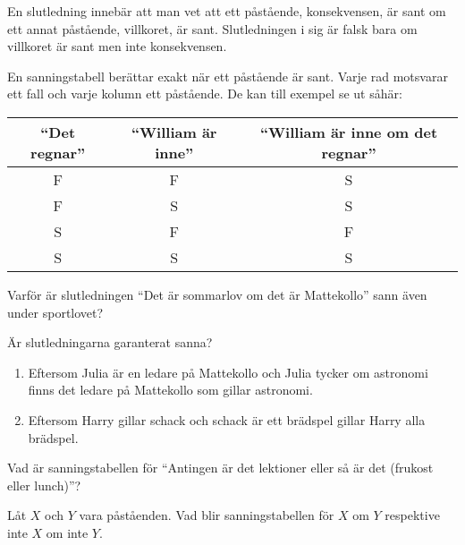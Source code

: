 \begin{definition}[Slutledning]
	En slutledning innebär att man vet att ett påstående, konsekvensen, är sant om ett annat påstående, villkoret, är sant. Slutledningen i sig är falsk bara om villkoret är sant men inte konsekvensen.
\end{definition}

\begin{definition}[Sanningstabell] %
	En sanningstabell berättar exakt när ett påstående är sant. Varje rad motsvarar ett fall och varje kolumn ett påstående. De kan till exempel se ut såhär:
	\begin{center}
		\begin{tabular}{|c|c|c|}
			\hline
			``Det regnar'' & ``William är inne'' & ``William är inne om det regnar'' \\ \hline
			F & F & S \\ \hline
			F & S & S \\ \hline
			S & F & F \\ \hline
			S & S & S \\ \hline
		\end{tabular}
	\end{center}
\end{definition}

\begin{problem}
	Varför är slutledningen ``Det är sommarlov om det är Mattekollo'' sann även under sportlovet?
\end{problem}

\begin{problem}
	Är slutledningarna garanterat sanna?
	\begin{enumerate}[label=\alph*)]
		\item Eftersom Julia är en ledare på Mattekollo och Julia tycker om astronomi finns det ledare på Mattekollo som gillar astronomi.
		\item Eftersom Harry gillar schack och schack är ett brädspel gillar Harry alla brädspel.
	\end{enumerate}
\end{problem}

\begin{problem}
	Vad är sanningstabellen för ``Antingen är det lektioner eller så är det (frukost eller lunch)''?
\end{problem}

\begin{problem}%
	Låt \(X\) och \(Y\) vara påståenden. Vad blir sanningstabellen för \(X\) om \(Y\) respektive inte \(X\) om inte \(Y\).
\end{problem}

